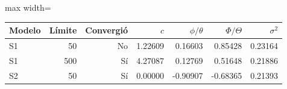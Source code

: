 \begin{center}\small\setlength{\tabcolsep}{4pt}
\begin{adjustbox}{max width=\textwidth}\begin{tabular}{lrrrrrr}
\toprule
Modelo & Límite & Convergió & $c$ & $\phi / \theta$ & $\Phi / \Theta$ & $\sigma^2$ \\ \midrule
S1 & 50 & No & 1.22609 & 0.16603 & 0.85428 & 0.23164 \\
S1 & 500 & Sí & 4.27087 & 0.12769 & 0.51648 & 0.21886 \\
S2 & 50 & Sí & 0.00000 & -0.90907 & -0.68365 & 0.21393 \\
\bottomrule\end{tabular}\end{adjustbox}\end{center}
